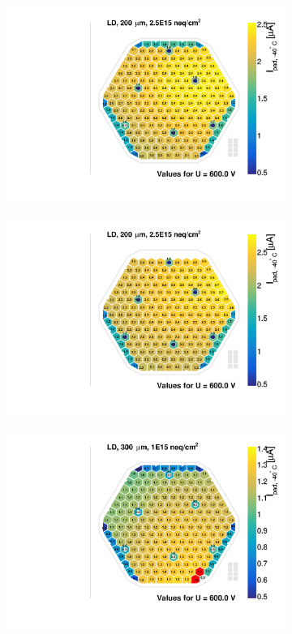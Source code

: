\begin{figure}
	\hfill
	\begin{subfigure}[b]{0.32\textwidth}
		\includegraphics[width=0.999\textwidth]{plots/iv_hexplots/0541_04.pdf}
		\subcaption{
		}
		\label{plot:iv_hexplot_0541_04}
	\end{subfigure}
	\hfill	
	\begin{subfigure}[b]{0.32\textwidth}
		\includegraphics[width=0.999\textwidth]{plots/iv_hexplots/2004.pdf}
		\subcaption{
		}
		\label{plot:iv_hexplot_2004}
	\end{subfigure}
	\hfill
	\begin{subfigure}[b]{0.32\textwidth}
		\includegraphics[width=0.999\textwidth]{plots/iv_hexplots/1013.pdf}

\end{subfigure}
\end{figure}

